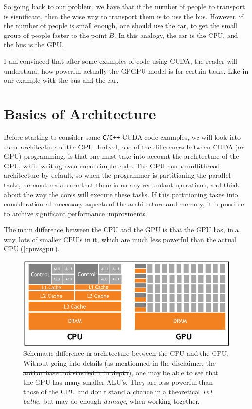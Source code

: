 \documentclass[12pt]{article}
\begin{document}
So going back to our problem, we have that if the number of people to transport is significant, 
then the wise way to transport them is to use the bus. However, if the number of people is small enough, 
one should use the car, to get the small group of people faster to the point $B$. 
In this analogy, the car is the CPU, and the bus is the GPU.

I am convinced that after some examples of code using CUDA, the reader will understand, how powerful
actually the GPGPU model is for certain tasks. Like in our example with the bus and the car.

\section{Basics of Architecture}

Before starting to consider some \verb|C/C++| CUDA code examples, we will look into some architecture of the GPU. 
Indeed, one of the differences between CUDA (or GPU) programming, is that one must take into account
the architecture of the GPU, while writing even some simple code. The GPU has a multithread architecture by default, 
so when the programmer is partitioning the parallel tasks, he must make sure that there is no any redundant
operations, and think about the way the cores will execute these tasks. If this partitioning takes into consideration all necessary aspects of the architecture and memory, it is possible to archive significant performance improvments.


The main difference between the CPU and the GPU is that the GPU has, in a way, lots of smaller CPU's in it, which 
are much less powerful than the actual CPU (\autoref{cpuvsgpu}).
\cite{tuomanen2018hands}

\begin{figure}
   \centering
   \includegraphics[scale=0.4]{pngs/cpuvsgpu.png}
   \caption{Schematic difference in architecture between the CPU and the GPU. Without going into details 
   (\sout{as mentionned in the disclaimer, the author have not studied it in depth}), one may be able to see that 
   the GPU has many smaller ALU's. They are less powerful than those of the CPU and don't stand a chance in 
    a theoretical \textit{1v1 battle}, but may do enough \textit{damage}, when working together.\cite{tuomanen2018hands}}
   \label{cpuvsgpu}
\end{figure}
\end{document}
